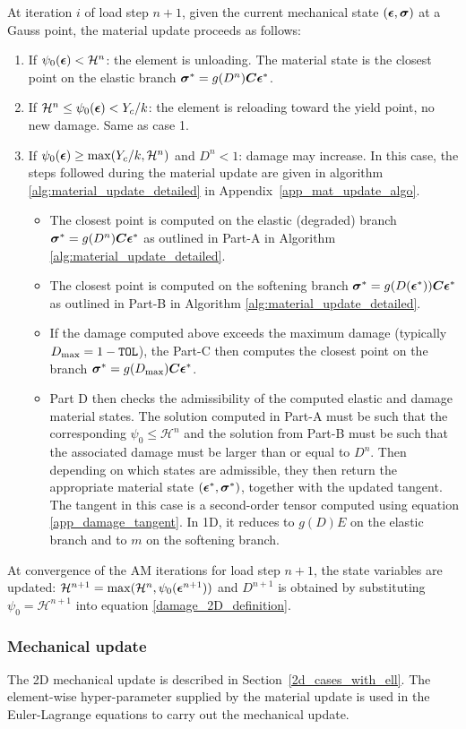 \documentclass[10pt]{cas-sc}
\newenvironment{addedblock}{}{}
\begin{document}
\begin{addedblock}
At iteration $i$ of load step $n+1$, given the current mechanical state $(\mbox{\boldmath $\epsilon$},\mbox{\boldmath $\sigma$})$ at a Gauss point, the material update proceeds as follows:
\begin{enumerate}
	\item If $\psi_0(\mbox{\boldmath $\epsilon$}) < \mathcal{H}^n$: the element is unloading. The material state is the closest point on the elastic branch $\mbox{\boldmath $\sigma$}^* = g(D^n) \mbox{\boldmath $C$} \mbox{\boldmath $\epsilon$}^*$.
	\item If $\mathcal{H}^n \leq \psi_0(\mbox{\boldmath $\epsilon$}) < Y_c/k$: the element is reloading toward the yield point, no new damage. Same as case 1.
	\item If $\psi_0(\mbox{\boldmath $\epsilon$}) \geq \max(Y_c/k,\mathcal{H}^n)$ and $D^n < 1$: damage may increase. In this case, the steps followed during the material update are given in algorithm \ref{alg:material_update_detailed} in Appendix~\ref{app_mat_update_algo}. 
	\begin{itemize}
		\item The closest point is computed on the elastic (degraded) branch $\mbox{\boldmath $\sigma$}^* = g(D^n) \mbox{\boldmath $C$} \mbox{\boldmath $\epsilon$}^*$ as outlined in Part-A in Algorithm \ref{alg:material_update_detailed}. 
		\item The closest point is computed on the softening branch $\mbox{\boldmath $\sigma$}^* = g(D(\mbox{\boldmath $\epsilon$}^*)) \mbox{\boldmath $C$} \mbox{\boldmath $\epsilon$}^*$ as outlined in Part-B in Algorithm \ref{alg:material_update_detailed}.
		\item If the damage computed above exceeds the maximum damage (typically $D_{\rm max}=1-\texttt{TOL}$), the Part-C then computes the closest point on the branch $\mbox{\boldmath $\sigma$}^* = g(D_{\rm max}) \mbox{\boldmath $C$} \mbox{\boldmath $\epsilon$}^*$. 
		\item Part D then checks the admissibility of the computed elastic and damage material states. The solution computed in Part-A must be such that the corresponding $\psi_0 \leq \mathcal{H}^n$ and the solution from Part-B must be such that the associated damage must be larger than or equal to $D^n$. Then depending on which states are admissible, they then return the appropriate material state $(\mbox{\boldmath $\epsilon$}^*, \mbox{\boldmath $\sigma$} ^*)$, together with the updated tangent. The tangent in this case is a second-order tensor computed using equation \ref{app_damage_tangent}. In 1D, it reduces to $g(D)E$ on the elastic branch and to $m$ on the softening branch.
	\end{itemize}
\end{enumerate}


At convergence of the AM iterations for load step $n+1$, the state variables are updated: $\mathcal{H}^{n+1} = \max(\mathcal{H}^n, \psi_0(\mbox{\boldmath $\epsilon$}^{n+1}))$ and  $D^{n+1}$ is obtained by substituting $\psi_0 = \mathcal{H}^{n+1}$ into equation \ref{damage_2D_definition}.

\subsubsection*{Mechanical update}
The 2D mechanical update is described in Section~\ref{2d_cases_with_ell}. The element-wise hyper-parameter supplied by the material update is used in the Euler-Lagrange equations to carry out the mechanical update.
\end{addedblock}
\end{document}
